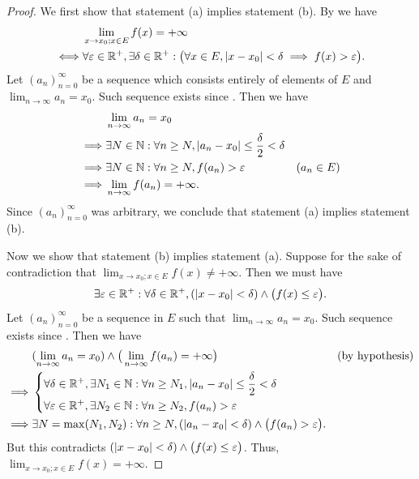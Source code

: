 \begin{proof}
  We first show that statement (a) implies statement (b).
  By  we have
  \begin{align*}
         & \lim_{x \to x_0 ; x \in E} f(x) = +\infty                                                                                              \\
    \iff & \forall \varepsilon \in \mathbb{R}^+, \exists \delta \in \mathbb{R}^+ : \big(\forall x \in E, \left\lvert x - x_0\right\rvert < \delta \implies f(x) > \varepsilon\big).
  \end{align*}
  Let \((a_n)_{n = 0}^\infty\) be a sequence which consists entirely of elements of \(E\) and \(\lim_{n \to \infty} a_n = x_0\).
  Such sequence exists since .
  Then we have
  \begin{align*}
             & \lim_{n \to \infty} a_n = x_0                                                                      \\
    \implies & \exists N \in \mathbb{N} : \forall n \geq N, \left\lvert a_n - x_0\right\rvert \leq \dfrac{\delta}{2} < \delta               \\
    \implies & \exists N \in \mathbb{N} : \forall n \geq N, f(a_n) > \varepsilon                            & (a_n \in E) \\
    \implies & \lim_{n \to \infty} f(a_n) = +\infty.
  \end{align*}
  Since \((a_n)_{n = 0}^\infty\) was arbitrary, we conclude that statement (a) implies statement (b).

  Now we show that statement (b) implies statement (a).
  Suppose for the sake of contradiction that \(\lim_{x \to x_0 ; x \in E} f(x) \neq +\infty\).
  Then we must have
  \[
    \exists \varepsilon \in \mathbb{R}^+ : \forall \delta \in \mathbb{R}^+, (\left\lvert x - x_0\right\rvert < \delta) \land \big(f(x) \leq \varepsilon\big).
  \]
  Let \((a_n)_{n = 0}^\infty\) be a sequence in \(E\) such that \(\lim_{n \to \infty} a_n = x_0\).
  Such sequence exists since .
  Then we have
  \begin{align*}
             & (\lim_{n \to \infty} a_n = x_0) \land \big(\lim_{n \to \infty} f(a_n) = +\infty\big)                                 &  & \text{(by hypothesis)} \\
    \implies & \begin{dcases}
                 \forall \delta \in \mathbb{R}^+, \exists N_1 \in \mathbb{N} : \forall n \geq N_1, \left\lvert a_n - x_0\right\rvert \leq \dfrac{\delta}{2} < \delta \\
                 \forall \varepsilon \in \mathbb{R}^+, \exists N_2 \in \mathbb{N} : \forall n \geq N_2, f(a_n) > \varepsilon
               \end{dcases}                                \\
    \implies & \exists N = \max(N_1, N_2) : \forall n \geq N, (\left\lvert a_n - x_0\right\rvert < \delta) \land \big(f(a_n) > \varepsilon\big).
  \end{align*}
  But this contradicts \((\left\lvert x - x_0\right\rvert < \delta) \land \big(f(x) \leq \varepsilon\big)\).
  Thus, \(\lim_{x \to x_0 ; x \in E} f(x) = +\infty\).
\end{proof}

